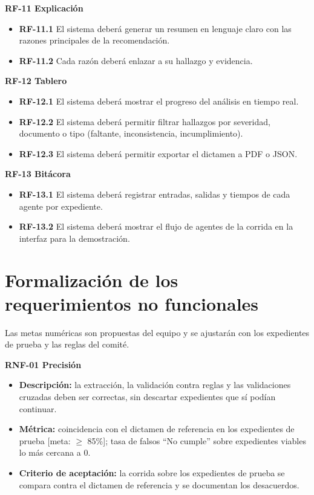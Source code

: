 \documentclass[11pt, a4paper]{article}
\begin{document}
\textbf{RF-11 Explicación}
\begin{itemize}
    \item \textbf{RF-11.1} El sistema deberá generar un resumen en lenguaje claro con las razones principales de la recomendación.
    \item \textbf{RF-11.2} Cada razón deberá enlazar a su hallazgo y evidencia.
\end{itemize}

\textbf{RF-12 Tablero}
\begin{itemize}
    \item \textbf{RF-12.1} El sistema deberá mostrar el progreso del análisis en tiempo real.
    \item \textbf{RF-12.2} El sistema deberá permitir filtrar hallazgos por severidad, documento o tipo (faltante, inconsistencia, incumplimiento).
    \item \textbf{RF-12.3} El sistema deberá permitir exportar el dictamen a PDF o JSON.
\end{itemize}

\textbf{RF-13 Bitácora}
\begin{itemize}
    \item \textbf{RF-13.1} El sistema deberá registrar entradas, salidas y tiempos de cada agente por expediente.
    \item \textbf{RF-13.2} El sistema deberá mostrar el flujo de agentes de la corrida en la interfaz para la demostración.
\end{itemize}

\section{Formalización de los requerimientos no funcionales}

Las metas numéricas son propuestas del equipo y se ajustarán con los expedientes de prueba y las reglas del comité.

\textbf{RNF-01 Precisión}
\begin{itemize}
    \item \textbf{Descripción:} la extracción, la validación contra reglas y las validaciones cruzadas deben ser correctas, sin descartar expedientes que sí podían continuar.
    \item \textbf{Métrica:} coincidencia con el dictamen de referencia en los expedientes de prueba [meta: $\ge$ 85\%]; tasa de falsos ``No cumple'' sobre expedientes viables lo más cercana a 0.
    \item \textbf{Criterio de aceptación:} la corrida sobre los expedientes de prueba se compara contra el dictamen de referencia y se documentan los desacuerdos.
\end{itemize}
\end{document}
